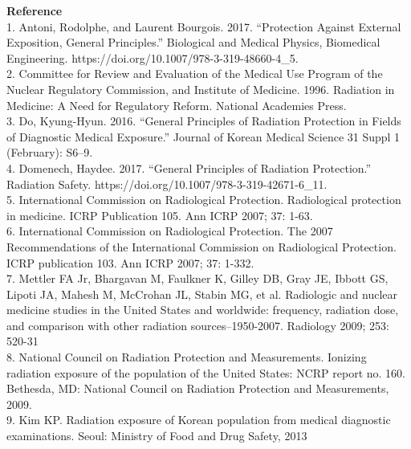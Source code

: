 \documentclass{article}
\begin{document}
\newpage 
\Large\textbf{Reference} \\

\large
1.	Antoni, Rodolphe, and Laurent Bourgois. 2017. “Protection Against External Exposition, General Principles.” Biological and Medical Physics, Biomedical Engineering. https://doi.org/10.1007/978-3-319-48660-4_5. \\

2.	Committee for Review and Evaluation of the Medical Use Program of the Nuclear Regulatory Commission, and Institute of Medicine. 1996. Radiation in Medicine: A Need for Regulatory Reform. National Academies Press. \\

3.	Do, Kyung-Hyun. 2016. “General Principles of Radiation Protection in Fields of Diagnostic Medical Exposure.” Journal of Korean Medical Science 31 Suppl 1 (February): S6–9. \\

4.	Domenech, Haydee. 2017. “General Principles of Radiation Protection.” Radiation Safety. https://doi.org/10.1007/978-3-319-42671-6_11. \\

5.	International Commission on Radiological Protection. Radiological protection in medicine. ICRP Publication 105. Ann ICRP 2007; 37: 1-63. \\

6.	International Commission on Radiological Protection. The 2007 Recommendations of the International Commission on Radiological Protection. ICRP publication 103. Ann ICRP 2007; 37: 1-332. \\

7.	Mettler FA Jr, Bhargavan M, Faulkner K, Gilley DB, Gray JE, Ibbott GS, Lipoti JA, Mahesh M, McCrohan JL, Stabin MG, et al. Radiologic and nuclear medicine studies in the United States and worldwide: frequency, radiation dose, and comparison with other radiation sources--1950-2007. Radiology 2009; 253: 520-31 \\

8.	National Council on Radiation Protection and Measurements. Ionizing radiation exposure of the population of the United States: NCRP report no. 160. Bethesda, MD: National Council on Radiation Protection and Measurements, 2009. \\

9.	Kim KP. Radiation exposure of Korean population from medical diagnostic examinations. Seoul: Ministry of Food and Drug Safety, 2013
\end{document}
